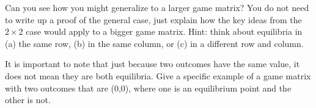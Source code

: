 \begin{xca}\label{E:nxn}
Can you see how you might generalize to a larger game matrix? You do not need to write up a proof of the general case, just explain how the key ideas from the $2 \times 2$ case would apply to a bigger game matrix. Hint: think about equilibria in (a) the same row, (b) in the same column, or (c) in a different row and column. 
\end{xca}

\begin{xca}\label{E:nonequil}
It is important to note that just because two outcomes have the same value, it does not mean they are both equilibria. Give a specific example of a game matrix with two outcomes that are (0,0), where one is an equilibrium point and the other is not.
\end{xca}




 